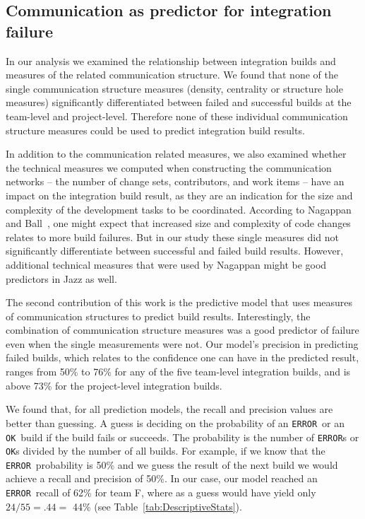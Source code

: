 \documentclass[12pt,oneside]{book}
\newcommand\error{\texttt{ERROR}}
\newcommand\ok{\texttt{OK}}
\begin{document}
\subsection{Communication as predictor for integration failure}
\label{subsec:commaspred}
In our analysis we examined the relationship between integration builds and
measures of the related communication structure. We found that none of the single
communication structure measures (density, centrality or structure hole measures)
significantly differentiated between failed and successful builds at the
team-level and project-level. Therefore none of these individual communication
structure measures could be used to predict integration build results.


In addition to the communication related measures, we also examined whether the
technical measures we computed when constructing the communication networks --
the number of change sets, contributors, and work items -- have an impact on the
integration build result, as they are an indication for the size and complexity
of the development tasks to be coordinated. According to Nagappan and
Ball~\cite{nagappan2005:churn}, one might expect that increased size and complexity
of code changes relates to more build failures. But in our study these single
measures did not significantly differentiate between successful and failed build
results. However, additional technical measures that were used by Nagappan might
be good predictors in Jazz as well.



The second contribution of this work is the predictive model that uses measures
of communication structures to predict build results. Interestingly, the
combination of communication structure measures was a good predictor of failure
even when the single measurements were not. Our model's precision in predicting
failed builds, which relates to the confidence one can have in the predicted
result, ranges from 50\% to 76\% for any of the five team-level integration
builds, and is above 73\% for the project-level integration builds.

We found that, for all prediction models, the recall and precision values are
better than guessing. A guess is deciding on the probability of an \error\ or an
\ok\ build if the build fails or succeeds. The probability is the number of
\error s or \ok s divided by the number of all builds. For example, if we know
that the \error\ probability is 50\% and we guess the result of the next build we
would achieve a recall and precision of 50\%. In our case, our model reached an
\error\ recall of 62\% for team F, where as a guess would have yield only
$24/55=.44=$ 44\% (see Table~\ref{tab:DescriptiveStats}).
\end{document}
